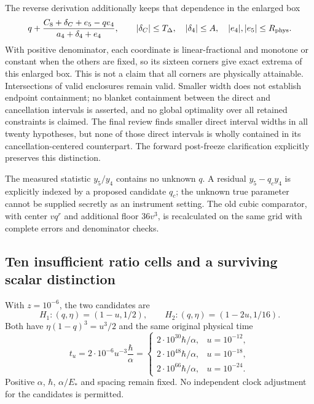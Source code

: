 The reverse derivation additionally keeps that dependence in the enlarged box
\begin{equation}
 q+\frac{C_8+\delta_C+e_5-qe_4}{a_4+\delta_4+e_4},\qquad
 |\delta_C|\le T_\Delta,\quad |\delta_4|\le A,\quad
 |e_4|,|e_5|\le R_{\rm phys}.
 \label{eq:ai3-shared-corners}
\end{equation}
With positive denominator, each coordinate is linear-fractional and monotone or constant when the others are fixed, so its sixteen corners give exact extrema of this enlarged box. This is not a claim that all corners are physically attainable. Intersections of valid enclosures remain valid. Smaller width does not establish endpoint containment; no blanket containment between the direct and cancellation intervals is asserted, and no global optimality over all retained constraints is claimed. The final review finds smaller direct interval widths in all twenty hypotheses, but none of those direct intervals is wholly contained in its cancellation-centered counterpart. The forward post-freeze clarification explicitly preserves this distinction.

The measured statistic $y_5/y_4$ contains no unknown $q$. A residual $y_5-q_cy_4$ is explicitly indexed by a proposed candidate $q_c$; the unknown true parameter cannot be supplied secretly as an instrument setting. The old cubic comparator, with center $vq^r$ and additional floor $36v^3$, is recalculated on the same grid with complete errors and denominator checks.

\subsection{Ten insufficient ratio cells and a surviving scalar distinction}
With $z=10^{-6}$, the two candidates are
\begin{equation}
 H_1:(q,\eta)=(1-u,1/2),\qquad
 H_2:(q,\eta)=(1-2u,1/16).
 \label{eq:ai3-candidates}
\end{equation}
Both have $\eta(1-q)^3=u^3/2$ and the same original physical time
\begin{equation}
 t_u=2\cdot10^{-6}u^{-3}\frac{\hbar}{\alpha}
 =\begin{cases}
 2\cdot10^{30}\hbar/\alpha,&u=10^{-12},\\
 2\cdot10^{48}\hbar/\alpha,&u=10^{-18},\\
 2\cdot10^{66}\hbar/\alpha,&u=10^{-24}.
 \end{cases}
 \label{eq:ai3-clock}
\end{equation}
Positive $\alpha$, $\hbar$, $\alpha/E_*$ and spacing remain fixed. No independent clock adjustment for the candidates is permitted.

